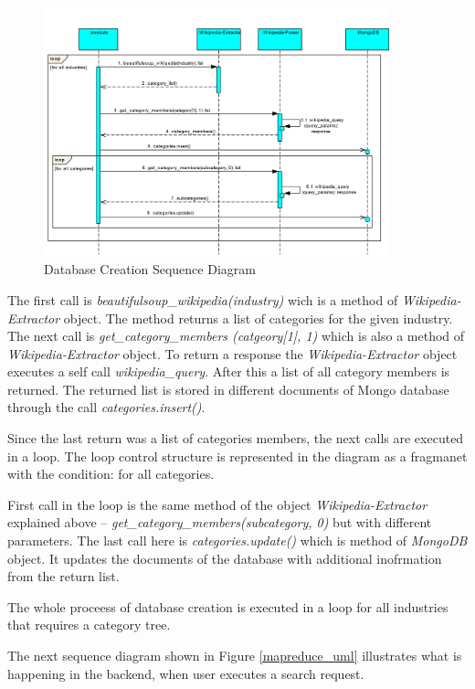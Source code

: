 \begin{figure}[!ht]
\centering
\includegraphics[width=10cm]{CreateDB-1}
\caption{Database Creation Sequence Diagram}\label{createDB_uml}
\end{figure}

The first call is \textit{beautifulsoup\_wikipedia(industry)} wich is a method of \textit{Wikipedia-Extractor} object. The method returns a list of categories for the given industry. The next call is \textit{get\_category\_members (catgeory[1], 1)} which is also a method of \textit{Wikipedia-Extractor} object. To return a response the \textit{Wikipedia-Extractor} object executes a self call \textit{wikipedia\_query}. After this a list of all category members is returned. The returned list is stored in different documents of Mongo database through the call \textit{categories.insert()}.

Since the last return was a list of categories members, the next calls are executed in a loop. The loop control structure is represented in the diagram as a fragmanet with the condition: for all categories. 

First call in the loop is the same method of the object \textit{Wikipedia-Extractor} explained above -- \textit{get\_category\_members(subcategory, 0)} but with different parameters. The last call here is \textit{categories.update()} which is method of \textit{MongoDB} object. It updates the documents of the database with additional inofrmation from the return list. 

The whole proceess of database creation is executed in a loop for all industries that requires a category tree. 

The next sequence diagram shown in Figure \ref{mapreduce_uml} illustrates what is happening in the backend, when user executes a search request.

